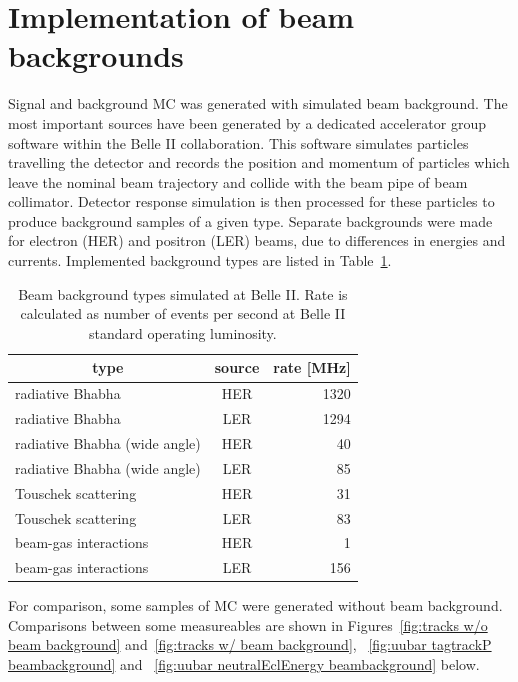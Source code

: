 \documentclass[12pt]{thesis}  %
\begin{document}
\section{Implementation of beam backgrounds}

Signal and background MC was generated with simulated beam background. The most important sources have been generated by a dedicated accelerator group software within the Belle II collaboration. This software simulates particles travelling the detector and records the position and momentum of particles which leave the nominal beam trajectory and collide with the beam pipe of beam collimator. Detector response simulation is then processed for these particles to produce background samples of a given type. Separate backgrounds were made for electron (HER) and positron (LER) beams, due to differences in energies and currents. Implemented background types are listed in Table~\ref{tab:beam background types}.


\begin{table}[h]
\centering
\begin{tabular}{lcr}
\hline
\multicolumn{1}{c}{type}      & source & \multicolumn{1}{c}{rate [MHz]} \\ \hline
radiative Bhabha              & HER    & \num{1320}                     \\
radiative Bhabha              & LER    & \num{1294}                     \\
radiative Bhabha (wide angle) & HER    & \num{40}                       \\
radiative Bhabha (wide angle) & LER    & \num{85}                       \\
Touschek scattering           & HER    & \num{31}                       \\
Touschek scattering           & LER    & \num{83}                       \\
beam-gas interactions         & HER    & \num{1}                        \\
beam-gas interactions         & LER    & \num{156}                      \\ \hline
\end{tabular}
\caption[]%
{{\small Beam background types simulated at Belle II. Rate is calculated as number of events per second at Belle II standard operating luminosity\cite{BelleII:simulation}.}}
\label{tab:beam background types}
\end{table}


For comparison, some samples of MC were generated without beam background. Comparisons between some measureables are shown in Figures~\ref{fig:tracks w/o beam background} and~\ref{fig:tracks w/ beam background}, ~\ref{fig:uubar tagtrackP beambackground} and ~\ref{fig:uubar neutralEclEnergy beambackground} below.
\end{document}
